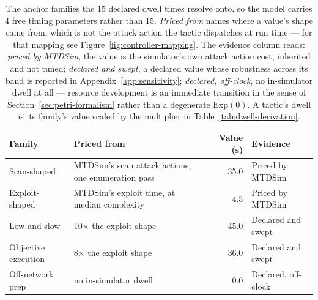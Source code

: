 
\begin{table}[htbp]
\centering
\footnotesize
\caption[Anchor families of the declared dwell times]{The anchor families the 15 declared dwell times resolve onto, so the model carries 4 free timing parameters rather than 15. \emph{Priced from} names where a value's shape came from, which is not the attack action the tactic dispatches at run time --- for that mapping see Figure~\ref{fig:controller-mapping}. The evidence column reads: \emph{priced by MTDSim}, the value is the simulator's own attack action cost, inherited and not tuned; \emph{declared and swept}, a declared value whose robustness across its band is reported in Appendix~\ref{app:sensitivity}; \emph{declared, off-clock}, no in-simulator dwell at all --- resource development is an immediate transition in the sense of Section~\ref{sec:petri-formalism} rather than a degenerate $\mathrm{Exp}(0)$. A tactic's dwell is its family's value scaled by the multiplier in Table~\ref{tab:dwell-derivation}.}
\label{tab:dwell-anchors}
\begin{tabular}{@{}l l r l@{}}
\toprule
Family & Priced from & Value (s) & Evidence \\
\midrule
Scan-shaped & MTDSim's scan attack actions, one enumeration pass & 35.0 & Priced by MTDSim \\
Exploit-shaped & MTDSim's exploit time, at median complexity & 4.5 & Priced by MTDSim \\
Low-and-slow & 10$\times$ the exploit shape & 45.0 & Declared and swept \\
Objective execution & 8$\times$ the exploit shape & 36.0 & Declared and swept \\
Off-network prep & no in-simulator dwell & 0.0 & Declared, off-clock \\
\bottomrule
\end{tabular}
\end{table}

